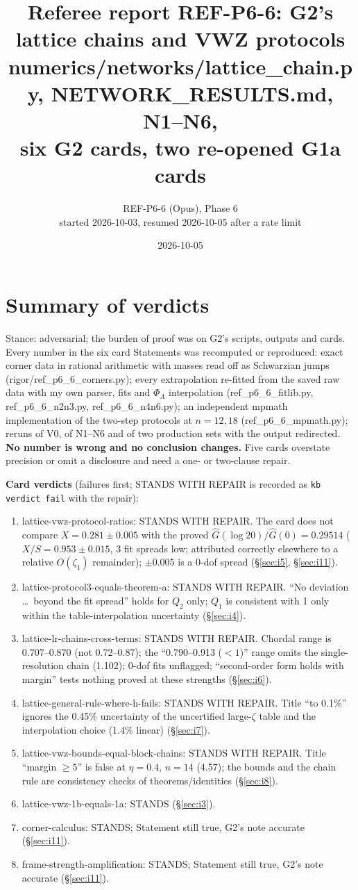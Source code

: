 \documentclass[11pt]{article}
\title{Referee report REF-P6-6: G2's lattice chains and VWZ protocols\\
\small numerics/networks/lattice\_chain.py, NETWORK\_RESULTS.md, N1--N6,\\ six G2 cards, two re-opened G1a cards}
\author{REF-P6-6 (Opus), Phase 6\\ started 2026-10-03, resumed 2026-10-05 after a rate limit}
\date{2026-10-05}
\begin{document}
\sloppy
\maketitle

\section*{Summary of verdicts}
Stance: adversarial; the burden of proof was on G2's scripts, outputs and cards. Every number in the six card
Statements was recomputed or reproduced: exact corner data in rational arithmetic with masses read off as
Schwarzian jumps (rigor/ref\_p6\_6\_corners.py); every extrapolation re-fitted from the saved raw data with my own
parser, fits and $\Phi_A$ interpolation (ref\_p6\_6\_fitlib.py, ref\_p6\_6\_n2n3.py, ref\_p6\_6\_n4n6.py); an
independent mpmath implementation of the two-step protocols at $n=12,18$ (ref\_p6\_6\_mpmath.py); reruns of V0, of
N1--N6 and of two production sets with the output redirected. \textbf{No number is wrong and no conclusion
changes.} Five cards overstate precision or omit a disclosure and need a one- or two-clause repair.

\medskip\noindent\textbf{Card verdicts} (failures first; STANDS WITH REPAIR is recorded as \texttt{kb verdict fail}
with the repair):
\begin{enumerate}[leftmargin=2em]
\item lattice-vwz-protocol-ratios: STANDS WITH REPAIR. The card does not compare $X=0.281\pm0.005$ with the proved
 $\hat G(\log20)/\hat G(0)=0.29514$ ($X/S=0.953\pm0.015$, 3 fit spreads low; attributed correctly elsewhere to a
 relative $O(\zeta_1)$ remainder); $\pm0.005$ is a 0-dof spread (\S\ref{sec:i5}, \S\ref{sec:i11}).
\item lattice-protocol3-equals-theorem-a: STANDS WITH REPAIR. ``No deviation \ldots\ beyond the fit spread'' holds for
 $Q_2$ only; $Q_1$ is consistent with 1 only within the table-interpolation uncertainty (\S\ref{sec:i4}).
\item lattice-lr-chains-cross-terms: STANDS WITH REPAIR. Chordal range is $0.707$--$0.870$ (not 0.72--0.87); the
 ``0.790--0.913 ($<1$)'' range omits the single-resolution chain (1.102); 0-dof fits unflagged; ``second-order form
 holds with margin'' tests nothing proved at these strengths (\S\ref{sec:i6}).
\item lattice-general-rule-where-h-fails: STANDS WITH REPAIR. Title ``to 0.1\%'' ignores the 0.45\% uncertainty of the
 uncertified large-$\zeta$ table and the interpolation choice (1.4\% linear) (\S\ref{sec:i7}).
\item lattice-vwz-bounds-equal-block-chains: STANDS WITH REPAIR. Title ``margin $\ge5$'' is false at $\eta=0.4$, $n=14$
 (4.57); the bounds and the chain rule are consistency checks of theorems/identities (\S\ref{sec:i8}).
\item lattice-vwz-1b-equals-1a: STANDS (\S\ref{sec:i3}).
\item corner-calculus: STANDS; Statement still true, G2's note accurate (\S\ref{sec:i11}).
\item frame-strength-amplification: STANDS; Statement still true, G2's note accurate (\S\ref{sec:i11}).
\end{enumerate}
\end{document}
